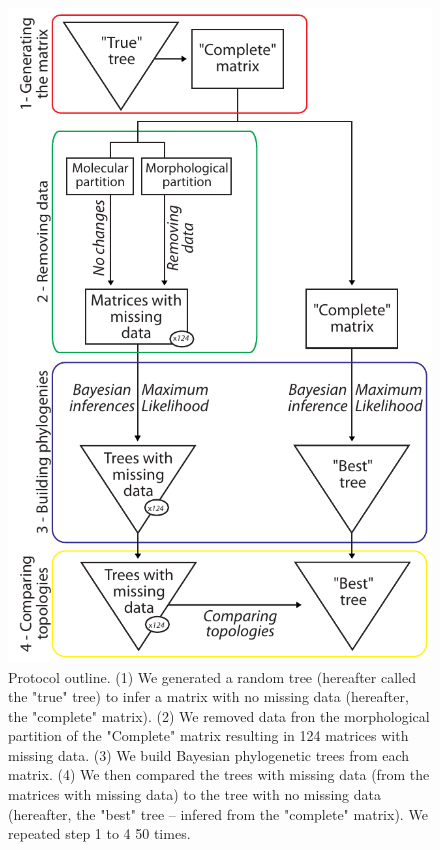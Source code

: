 \documentclass[12pt,letterpaper]{article}
\begin{document}
\begin{figure}
\centering
\includegraphics[keepaspectratio=true]{Figures/TEM_Fig_outline.pdf}
\caption{Protocol outline. (1) We generated a random tree (hereafter called the "true" tree) to infer a matrix with no missing data (hereafter, the "complete" matrix). (2) We removed data fron the morphological partition of the "Complete" matrix resulting in 124 matrices with missing data. (3) We build Bayesian phylogenetic trees from each matrix. (4) We then compared the trees with missing data (from the matrices with missing data) to the tree with no missing data (hereafter, the "best" tree – infered from the "complete" matrix). We repeated step 1 to 4 50 times.}
\label{Fig_Outline}
\end{figure}
\end{document}

